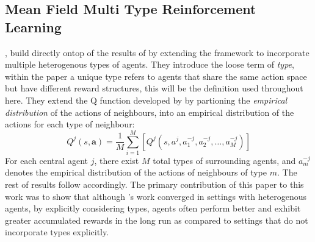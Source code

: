 \subsection{Mean Field Multi Type Reinforcement Learning}
\cite{Sriram2020}, build directly ontop of the results of \cite{Yang2018} by extending the framework
to incorporate multiple heterogenous types of agents. They introduce the loose term of \emph{type},
within the paper a unique type refers to agents that share the same action space but have different
reward structures, this will be the definition used throughout here. They extend the Q function
developed by \cite{Yang2018} by partioning the \emph{empirical distribution} of the actions of
neighbours, into an empirical distribution of the actions for each type of neighbour:
\begin{equation}
    Q^j(s,\mathbf{a}) = \frac{1}{M} \sum_{i=1}^{M}[Q^j(s, a^j, a^{-j}_1, a^{-j}_2, \hdots, a^{-j}_M)]
\end{equation}
For each central agent $j$, there exist $M$ total types of surrounding agents, 
and $a^{-j}_m$ denotes the empirical distribution of the actions of neighbours of type $m$. The rest 
of \cite{Yang2018} results follow accordingly. The primary contribution of this paper to this work was to show
that although \cite{Yang2018}'s work converged in settings with heterogenous agents, by explicitly
considering types, agents often perform better and exhibit greater accumulated rewards in the long run
as compared to settings that do not incorporate types explicitly.